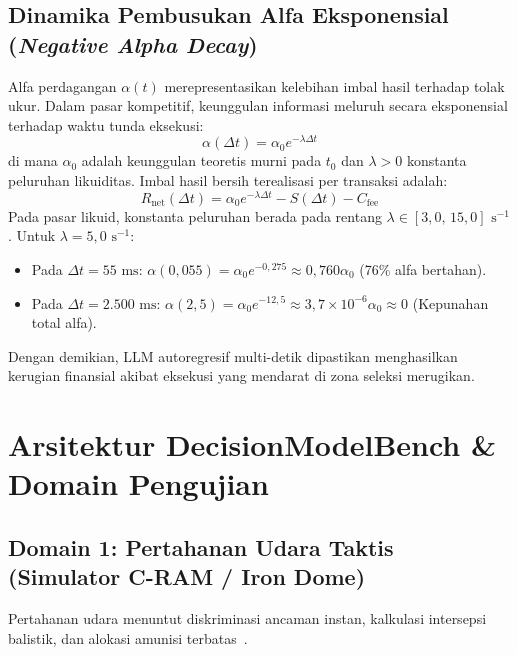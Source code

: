 \documentclass[journal,compsoc]{IEEEtran}
\begin{document}
\subsection{Dinamika Pembusukan Alfa Eksponensial (\textit{Negative Alpha Decay})}
Alfa perdagangan $\alpha(t)$ merepresentasikan kelebihan imbal hasil terhadap tolak ukur. Dalam pasar kompetitif, keunggulan informasi meluruh secara eksponensial terhadap waktu tunda eksekusi:
\begin{equation}
\alpha(\Delta t) = \alpha_0 e^{-\lambda \Delta t}
\end{equation}
di mana $\alpha_0$ adalah keunggulan teoretis murni pada $t_0$ dan $\lambda > 0$ konstanta peluruhan likuiditas. Imbal hasil bersih terealisasi per transaksi adalah:
\begin{equation}
R_{\text{net}}(\Delta t) = \alpha_0 e^{-\lambda \Delta t} - S(\Delta t) - C_{\text{fee}}
\end{equation}
Pada pasar likuid, konstanta peluruhan berada pada rentang $\lambda \in [3,0, \, 15,0] \text{ s}^{-1}$. Untuk $\lambda = 5,0 \text{ s}^{-1}$:
\begin{itemize}
    \item Pada $\Delta t = 55 \text{ ms}$: $\alpha(0,055) = \alpha_0 e^{-0,275} \approx 0,760 \alpha_0$ (76\% alfa bertahan).
    \item Pada $\Delta t = 2.500 \text{ ms}$: $\alpha(2,5) = \alpha_0 e^{-12,5} \approx 3,7 \times 10^{-6} \alpha_0 \approx 0$ (Kepunahan total alfa).
\end{itemize}
Dengan demikian, LLM autoregresif multi-detik dipastikan menghasilkan kerugian finansial akibat eksekusi yang mendarat di zona seleksi merugikan.

\section{Arsitektur DecisionModelBench \& Domain Pengujian}

\subsection{Domain 1: Pertahanan Udara Taktis (Simulator C-RAM / Iron Dome)}
Pertahanan udara menuntut diskriminasi ancaman instan, kalkulasi intersepsi balistik, dan alokasi amunisi terbatas~\cite{zandbergen2022accuracy}.
\end{document}
